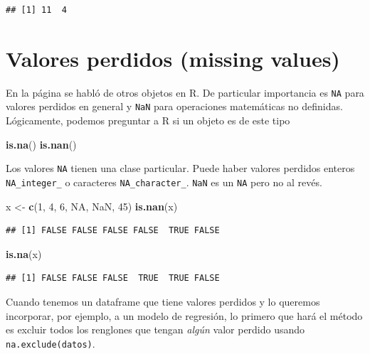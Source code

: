\documentclass[]{article}
\newenvironment{Shaded}{\begin{snugshade}}{\end{snugshade}}
\newcommand{\KeywordTok}[1]{\textcolor[rgb]{0.13,0.29,0.53}{\textbf{{#1}}}}
\newcommand{\DecValTok}[1]{\textcolor[rgb]{0.00,0.00,0.81}{{#1}}}
\newcommand{\StringTok}[1]{\textcolor[rgb]{0.31,0.60,0.02}{{#1}}}
\newcommand{\OtherTok}[1]{\textcolor[rgb]{0.56,0.35,0.01}{{#1}}}
\newcommand{\NormalTok}[1]{{#1}}
\begin{document}
\begin{verbatim}
## [1] 11  4
\end{verbatim}

\section{Valores perdidos (missing
values)}\label{valores-perdidos-missing-values}

En la página \pageref{otros-objetos-importantes} se habló de otros
objetos en R. De particular importancia es \texttt{NA} para valores
perdidos en general y \texttt{NaN} para operaciones matemáticas no
definidas. Lógicamente, podemos preguntar a R si un objeto es de este
tipo

\begin{Shaded}
\begin{Highlighting}[]
\KeywordTok{is.na}\NormalTok{()}
\KeywordTok{is.nan}\NormalTok{()}
\end{Highlighting}
\end{Shaded}

Los valores \texttt{NA} tienen una clase particular. Puede haber valores
perdidos enteros \texttt{NA\_integer\_} o caracteres
\texttt{NA\_character\_}. \texttt{NaN} es un \texttt{NA} pero no al
revés.

\begin{Shaded}
\begin{Highlighting}[]
\NormalTok{x <-}\StringTok{ }\KeywordTok{c}\NormalTok{(}\DecValTok{1}\NormalTok{, }\DecValTok{4}\NormalTok{, }\DecValTok{6}\NormalTok{, }\OtherTok{NA}\NormalTok{, }\OtherTok{NaN}\NormalTok{, }\DecValTok{45}\NormalTok{)}
\KeywordTok{is.nan}\NormalTok{(x)}
\end{Highlighting}
\end{Shaded}

\begin{verbatim}
## [1] FALSE FALSE FALSE FALSE  TRUE FALSE
\end{verbatim}

\begin{Shaded}
\begin{Highlighting}[]
\KeywordTok{is.na}\NormalTok{(x)}
\end{Highlighting}
\end{Shaded}

\begin{verbatim}
## [1] FALSE FALSE FALSE  TRUE  TRUE FALSE
\end{verbatim}

Cuando tenemos un dataframe que tiene valores perdidos y lo queremos
incorporar, por ejemplo, a un modelo de regresión, lo primero que hará
el método es excluir todos los renglones que tengan \emph{algún} valor
perdido usando \texttt{na.exclude(datos)}.
\end{document}
